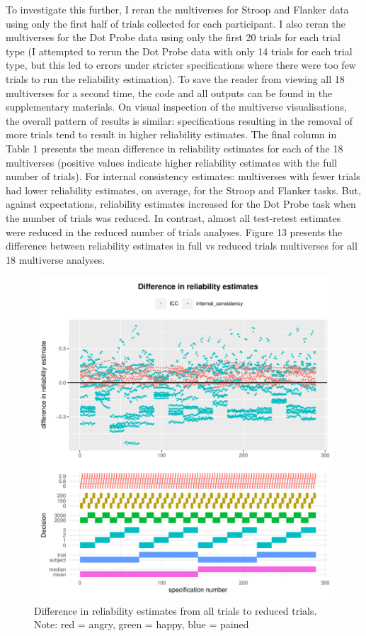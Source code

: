 \documentclass[
  man,floatsintext]{apa6}
\begin{document}
To investigate this further, I reran the multiverses for Stroop and Flanker data using only the first half of trials collected for each participant. I also reran the multiverses for the Dot Probe data using only the first 20 trials for each trial type (I attempted to rerun the Dot Probe data with only 14 trials for each trial type, but this led to errors under stricter specifications where there were too few trials to run the reliability estimation). To save the reader from viewing all 18 multiverses for a second time, the code and all outputs can be found in the supplementary materials. On visual inspection of the multiverse visualisations, the overall pattern of results is similar: specifications resulting in the removal of more trials tend to result in higher reliability estimates. The final column in Table 1 presents the mean difference in reliability estimates for each of the 18 multiverses (positive values indicate higher reliability estimates with the full number of trials). For internal consistency estimates: multiverses with fewer trials had lower reliability estimates, on average, for the Stroop and Flanker tasks. But, against expectations, reliability estimates increased for the Dot Probe task when the number of trials was reduced. In contrast, almost all test-retest estimates were reduced in the reduced number of trials analyses. Figure 13 presents the difference between reliability estimates in full vs reduced trials multiverses for all 18 multiverse analyses.

\begin{figure}
\centering
\includegraphics{Reliability_Multiverse_files/figure-latex/unnamed-chunk-18-1.pdf}
\caption{\label{fig:unnamed-chunk-18}Difference in reliability estimates from all trials to reduced trials. Note: red = angry, green = happy, blue = pained}
\end{figure}
\end{document}
